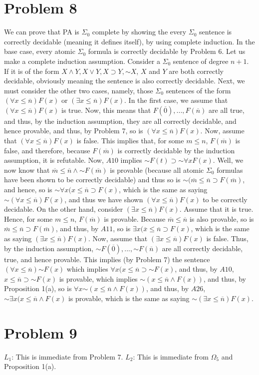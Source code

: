 \documentclass{article}
\newcommand*{\oldneg}{\mathord{\sim}}
\theoremstyle{definition}
\begin{document}
\section*{Problem 8}
We can prove that PA is $\Sigma_0$ complete by showing the every $\Sigma_0$ sentence is correctly decidable (meaning it defines itself), by using complete 
induction. In the base case, every atomic $\Sigma_0$ formula is correctly decidable by Problem 6. Let us make a complete induction assumption.
Consider a $\Sigma_0$ sentence of degree $n+1$. If it is of the form $X\wedge Y, X\vee Y, X\supset Y, \oldneg X$, 
$X$ and $Y$ are both correctly decidable, obviously meaning the sentence is also correctly decidable. 
\newline 
Next, we must consider the other two cases, namely, those $\Sigma_0$ sentences of the form 
$(\forall x\le \overline n)F(x)$ or $(\exists x\le \overline n)F(x)
$. In the first case, we assume that $(\forall x\le \overline n)F(x)$ 
is true. Now, this means that $F(\overline 0),...,F(\overline n)$ are all true, and thus,
 by the induction assumption, they are all correctly decidable, and hence provable, and thus, 
by Problem 7, so is $(\forall x\le \overline n)F(x)$. Now, assume that $(\forall x\le \overline n)F(x)$ is false. This implies that, for some $m\le n$, 
$F(\overline m)$ is false, 
and therefore, because $F(\overline m)$ is correctly decidable by the induction assumption, it is refutable. Now, $A10$ implies $\oldneg F(t)\supset 
\oldneg\forall xF(x)$. Well, we now know that $\overline m\le \overline n\wedge \oldneg F(\overline m)$ is provable (because all atomic $\Sigma_0$ 
formulas have been shown to be correctly decidable) and thus so is $\oldneg (\overline m\le \overline n\supset F(\overline m)$, and hence, so is
$\oldneg\forall x(x\le \overline n\supset F(x)$, which is the same as saying $\oldneg (\forall x\le \overline n)F(x)$, and thus we have shown 
$(\forall x\le \overline n)F(x)$ to be correctly decidable.\newline
On the other hand, consider $(\exists x\le \overline n)F(x)$. Assume that it is true. Hence, for some $m\le n$, $F(\overline m)$ is provable. 
Because $\overline m\le \overline n$ is also provable, so is $\overline m\le \overline n\supset F(\overline m)$, and thus, by $A11$, so is 
$\exists x(\overline x\le \overline n\supset F(x)$, which is the same as saying $(\exists x\le \overline n)F(x)$. Now, assume that $(\exists x\le \overline n
)F(x)$ is false. Thus, by the induction assumption, $\oldneg F(\overline 0),...,\oldneg F(\overline n)$ are all correctly decidable, 
true, and hence provable. 
This implies (by Problem 7) the sentence $(\forall x\le \overline n)\oldneg F(x)$ which implies $\forall x(x\le \overline n\supset \oldneg F(x)$, and thus, 
by $A10$, $x\le \overline n\supset \oldneg F(x)$ is provable, which implies $\oldneg(x\le \overline n\wedge F(x))$, and thus, by Proposition 1(a), 
so is $\forall x\oldneg(x\le \overline n\wedge F(x))$, and thus, by $A26$, $\oldneg\exists x(x\le \overline n\wedge F(x)$ is provable, which is the same 
as saying $\oldneg(\exists x\le \overline n)F(x)$.
\section*{Problem 9}
$L_1$: This is immediate from Problem 7.\newline
$L_2$: This is immediate from $\Omega_5$ and Proposition 1(a).
\end{document}
